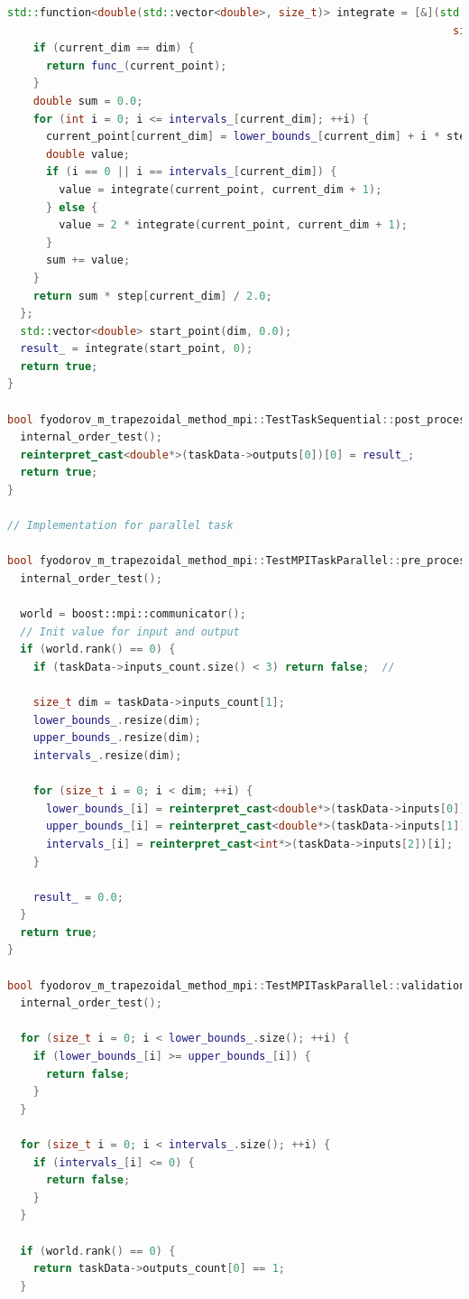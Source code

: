 \documentclass{article}
\begin{document}
\begin{lstlisting}[language=C++]
  std::function<double(std::vector<double>, size_t)> integrate = [&](std::vector<double> current_point,
                                                                     size_t current_dim) -> double {
    if (current_dim == dim) {
      return func_(current_point);
    }
    double sum = 0.0;
    for (int i = 0; i <= intervals_[current_dim]; ++i) {
      current_point[current_dim] = lower_bounds_[current_dim] + i * step[current_dim];
      double value;
      if (i == 0 || i == intervals_[current_dim]) {
        value = integrate(current_point, current_dim + 1);
      } else {
        value = 2 * integrate(current_point, current_dim + 1);
      }
      sum += value;
    }
    return sum * step[current_dim] / 2.0;
  };
  std::vector<double> start_point(dim, 0.0);
  result_ = integrate(start_point, 0);
  return true;
}

bool fyodorov_m_trapezoidal_method_mpi::TestTaskSequential::post_processing() {
  internal_order_test();
  reinterpret_cast<double*>(taskData->outputs[0])[0] = result_;
  return true;
}

// Implementation for parallel task

bool fyodorov_m_trapezoidal_method_mpi::TestMPITaskParallel::pre_processing() {
  internal_order_test();

  world = boost::mpi::communicator();
  // Init value for input and output
  if (world.rank() == 0) {
    if (taskData->inputs_count.size() < 3) return false;  //

    size_t dim = taskData->inputs_count[1];
    lower_bounds_.resize(dim);
    upper_bounds_.resize(dim);
    intervals_.resize(dim);

    for (size_t i = 0; i < dim; ++i) {
      lower_bounds_[i] = reinterpret_cast<double*>(taskData->inputs[0])[i];
      upper_bounds_[i] = reinterpret_cast<double*>(taskData->inputs[1])[i];
      intervals_[i] = reinterpret_cast<int*>(taskData->inputs[2])[i];
    }

    result_ = 0.0;
  }
  return true;
}

bool fyodorov_m_trapezoidal_method_mpi::TestMPITaskParallel::validation() {
  internal_order_test();

  for (size_t i = 0; i < lower_bounds_.size(); ++i) {
    if (lower_bounds_[i] >= upper_bounds_[i]) {
      return false;
    }
  }

  for (size_t i = 0; i < intervals_.size(); ++i) {
    if (intervals_[i] <= 0) {
      return false;
    }
  }

  if (world.rank() == 0) {
    return taskData->outputs_count[0] == 1;
  }


\end{lstlisting}
\end{document}
